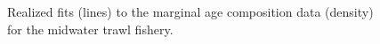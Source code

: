 \documentclass[
]{scrartcl}
\begin{document}
\begin{figure}[H]


\caption{\label{fig-marage_midt}Realized fits (lines) to the marginal
age composition data (density) for the midwater trawl fishery.}

\end{figure}%
\end{document}
